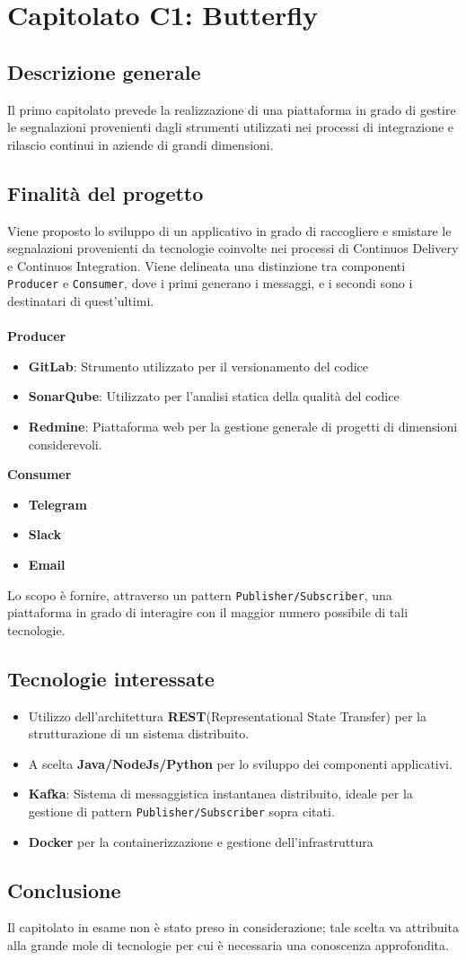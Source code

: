 \chapter{Capitolato C1: Butterfly}
\section{Descrizione generale}
Il primo capitolato prevede la realizzazione di una piattaforma in grado di gestire le segnalazioni provenienti dagli strumenti utilizzati nei processi di integrazione e rilascio continui in aziende di grandi dimensioni. 

\section{Finalit\`a del progetto}
Viene proposto lo sviluppo di un applicativo in grado di raccogliere e smistare le segnalazioni provenienti da tecnologie coinvolte nei processi di Continuos Delivery e Continuos Integration.
Viene delineata una distinzione tra componenti \texttt{Producer} e \texttt{Consumer}, dove i primi generano i messaggi, e i secondi sono i destinatari di quest'ultimi.\\
\\
\textbf{Producer}
	\begin{itemize}
	\item \textbf{GitLab}: Strumento utilizzato per il versionamento del codice
	\item \textbf{SonarQube}: Utilizzato per l'analisi statica della qualità del codice
	\item \textbf{Redmine}: Piattaforma web per la gestione generale di progetti di dimensioni considerevoli.
	\end{itemize}
\textbf{Consumer}
	\begin{itemize}	
		\item \textbf{Telegram}
		\item \textbf{Slack}
		\item \textbf{Email}
	\end{itemize}

Lo scopo è fornire, attraverso un pattern \texttt{Publisher/Subscriber}, una piattaforma in grado di interagire con il maggior numero possibile di tali tecnologie. 	
	
	
\section{Tecnologie interessate}
	\begin{itemize}
		\item Utilizzo dell'architettura \textbf{REST}(Representational State Transfer) per la strutturazione di un sistema distribuito.
		\item A scelta \textbf{Java/NodeJs/Python} per lo sviluppo dei componenti applicativi.
		\item \textbf{Kafka}: Sistema di messaggistica instantanea distribuito, ideale per la gestione di pattern \texttt{Publisher/Subscriber} sopra citati. 
		\item \textbf{Docker} per la containerizzazione e gestione dell'infrastruttura
	\end{itemize}


\section{Conclusione}
Il capitolato in esame non è stato preso in considerazione; tale scelta va attribuita alla grande mole di tecnologie per cui è necessaria una conoscenza approfondita.